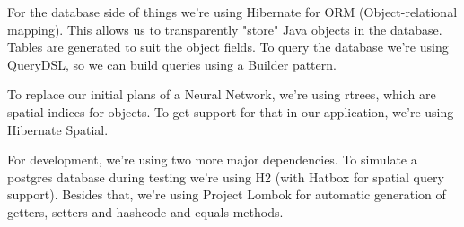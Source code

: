 For the database side of things we're using Hibernate for ORM (Object-relational mapping).
This allows us to transparently "store" Java objects in the database.
Tables are generated to suit the object fields.
To query the database we're using QueryDSL, so we can build queries using a Builder pattern.

To replace our initial plans of a Neural Network, we're using rtrees, which are spatial indices for objects.
To get support for that in our application, we're using Hibernate Spatial.

For development, we're using two more major dependencies.
To simulate a postgres database during testing we're using H2 (with Hatbox for spatial query support).
Besides that, we're using Project Lombok for automatic generation of getters, setters and hashcode and equals methods.
